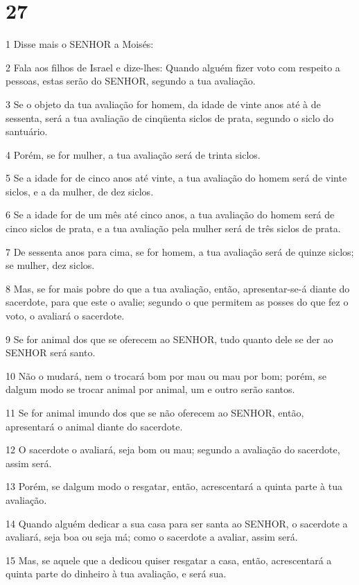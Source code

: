 \chapter{27}

\par 1 Disse mais o SENHOR a Moisés:
\par 2 Fala aos filhos de Israel e dize-lhes: Quando alguém fizer voto com respeito a pessoas, estas serão do SENHOR, segundo a tua avaliação.
\par 3 Se o objeto da tua avaliação for homem, da idade de vinte anos até à de sessenta, será a tua avaliação de cinqüenta siclos de prata, segundo o siclo do santuário.
\par 4 Porém, se for mulher, a tua avaliação será de trinta siclos.
\par 5 Se a idade for de cinco anos até vinte, a tua avaliação do homem será de vinte siclos, e a da mulher, de dez siclos.
\par 6 Se a idade for de um mês até cinco anos, a tua avaliação do homem será de cinco siclos de prata, e a tua avaliação pela mulher será de três siclos de prata.
\par 7 De sessenta anos para cima, se for homem, a tua avaliação será de quinze siclos; se mulher, dez siclos.
\par 8 Mas, se for mais pobre do que a tua avaliação, então, apresentar-se-á diante do sacerdote, para que este o avalie; segundo o que permitem as posses do que fez o voto, o avaliará o sacerdote.
\par 9 Se for animal dos que se oferecem ao SENHOR, tudo quanto dele se der ao SENHOR será santo.
\par 10 Não o mudará, nem o trocará bom por mau ou mau por bom; porém, se dalgum modo se trocar animal por animal, um e outro serão santos.
\par 11 Se for animal imundo dos que se não oferecem ao SENHOR, então, apresentará o animal diante do sacerdote.
\par 12 O sacerdote o avaliará, seja bom ou mau; segundo a avaliação do sacerdote, assim será.
\par 13 Porém, se dalgum modo o resgatar, então, acrescentará a quinta parte à tua avaliação.
\par 14 Quando alguém dedicar a sua casa para ser santa ao SENHOR, o sacerdote a avaliará, seja boa ou seja má; como o sacerdote a avaliar, assim será.
\par 15 Mas, se aquele que a dedicou quiser resgatar a casa, então, acrescentará a quinta parte do dinheiro à tua avaliação, e será sua.
